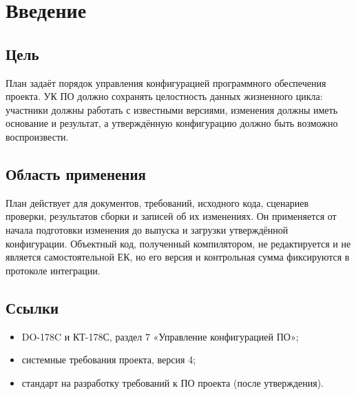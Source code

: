 \documentclass{tpks}
\begin{document}
\makeheader
\begin{changelog}
\end{changelog}

\section{Введение}

\subsection{Цель}

План задаёт порядок управления конфигурацией программного обеспечения проекта. УК ПО
должно сохранять целостность данных жизненного цикла: участники должны работать с
известными версиями, изменения должны иметь основание и результат, а утверждённую
конфигурацию должно быть возможно воспроизвести.

\subsection{Область применения}

План действует для документов, требований, исходного кода, сценариев проверки,
результатов сборки и записей об их изменениях. Он применяется от начала подготовки
изменения до выпуска и загрузки утверждённой конфигурации. Объектный код,
полученный компилятором, не редактируется и не является самостоятельной ЕК, но его
версия и контрольная сумма фиксируются в протоколе интеграции.

\subsection{Ссылки}

\begin{itemize}
  \item DO-178C и КТ-178С, раздел 7 «Управление конфигурацией ПО»;
  \item системные требования проекта, версия 4;
  \item стандарт на разработку требований к ПО проекта (после утверждения).
\end{itemize}
\end{document}
